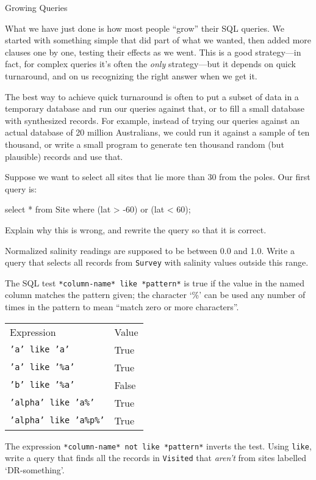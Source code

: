 \begin{swcbox}{Growing Queries}

What we have just done is how most people ``grow'' their SQL queries. We
started with something simple that did part of what we wanted, then
added more clauses one by one, testing their effects as we went. This is
a good strategy---in fact, for complex queries it's often the
\emph{only} strategy---but it depends on quick turnaround, and on us
recognizing the right answer when we get it.

The best way to achieve quick turnaround is often to put a subset of
data in a temporary database and run our queries against that, or to
fill a small database with synthesized records. For example, instead of
trying our queries against an actual database of 20 million Australians,
we could run it against a sample of ten thousand, or write a small
program to generate ten thousand random (but plausible) records and use
that.

\end{swcbox}

\begin{challenge}
  Suppose we want to select all sites that lie more than 30{\degree} from the
  poles. Our first query is:

\begin{VerbIn}
select * from Site where (lat > -60) or (lat < 60);
\end{VerbIn}

  Explain why this is wrong, and rewrite the query so that it is
  correct.
\end{challenge}

\begin{challenge}
  Normalized salinity readings are supposed to be between 0.0 and 1.0.
  Write a query that selects all records from \texttt{Survey} with
  salinity values outside this range.
\end{challenge}

\begin{challenge}
  The SQL test \texttt{*column-name* like *pattern*} is true if the
  value in the named column matches the pattern given; the character
  `\%' can be used any number of times in the pattern to mean ``match
  zero or more characters''.

  \begin{tabular}{ll}
    Expression & Value \\
    \texttt{'a' like 'a'} & True \\
    \texttt{'a' like '\%a'} & True \\
    \texttt{'b' like '\%a'} & False \\
    \texttt{'alpha' like 'a\%'} & True \\
    \texttt{'alpha' like 'a\%p\%'} & True \\
  \end{tabular}

  The expression \texttt{*column-name* not like *pattern*} inverts the
  test. Using \texttt{like}, write a query that finds all the records in
  \texttt{Visited} that \emph{aren't} from sites labelled
  `DR-something'.
\end{challenge}


